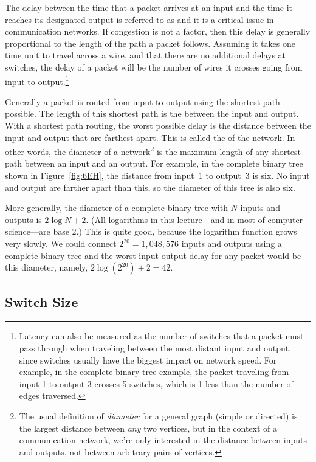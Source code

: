 The delay between the time that a packet arrives at an input and the
time it reaches its designated output is referred to as 
and it is a critical issue in communication networks.  If congestion
is not a factor, then this delay is generally proportional to the
length of the path a packet follows.  Assuming it takes one time unit
to travel across a wire, and that there are no additional delays at
switches, the delay of a packet will be the number of wires it crosses
going from input to output.\footnote{Latency can also be measured as
  the number of switches that a packet must pass through when
  traveling between the most distant input and output, since switches
  usually have the biggest impact on network speed.  For example, in
  the complete binary tree example, the packet traveling from input 1
  to output 3 crosses 5 switches, which is 1 less than the number of
  edges traversed.}

Generally a packet is routed from input to output using the shortest
path possible.  The length of this shortest path is the
 between the input and output.  With a shortest path
routing, the worst possible delay is the distance between the input
and output that are farthest apart.  This is called the
 of the network.  In other words, the diameter of a
network\footnote{The usual definition of \emph{diameter} for a general
  graph (simple or directed) is the largest distance between
  \emph{any} two vertices, but in the context of a communication
  network, we're only interested in the distance between inputs and
  outputs, not between arbitrary pairs of vertices.} is the maximum
length of any shortest path between an input and an output.  For
example, in the complete binary tree shown in Figure~\ref{fig:6EH},
the distance from input~1 to output~3 is six.  No input and output are
farther apart than this, so the diameter of this tree is also six.

More generally, the diameter of a complete binary tree with $N$ inputs
and outputs is $2 \log N + 2$.  (All logarithms in this lecture---and
in most of computer science---are base 2.)  This is quite good,
because the logarithm function grows very slowly.  We could connect
$2^{20} = 1{,}048{,}576$ inputs and outputs using a complete binary
tree and the worst input-output delay for any packet would be this
diameter, namely, $2 \log(2^{20}) + 2 = 42$.

\subsection{Switch Size}

